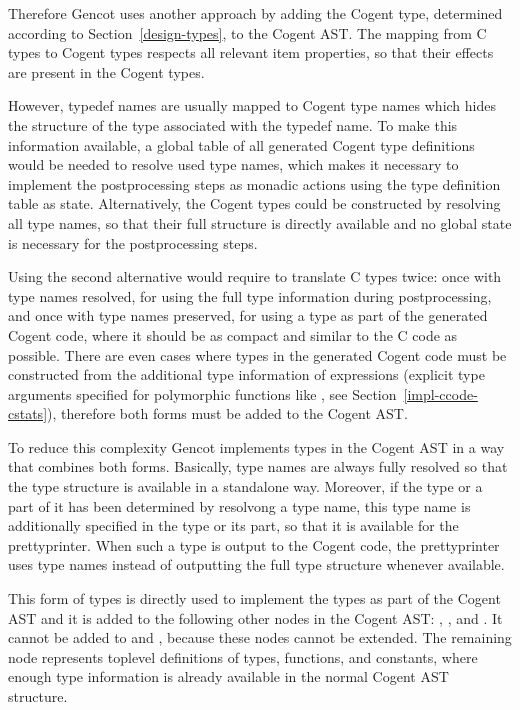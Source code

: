 Therefore Gencot uses another approach by adding the Cogent type, determined according to Section~\ref{design-types}, to
the Cogent AST. The mapping from C types to Cogent types respects all relevant item properties, so that their effects are
present in the Cogent types.

However, typedef names are usually mapped to Cogent type names which hides the structure of the type associated with the
typedef name. To make this information available, a global table of all generated Cogent type definitions would be needed
to resolve used type names, which makes it necessary to implement the postprocessing steps as monadic actions using the
type definition table as state. Alternatively, the Cogent types could be constructed by resolving all type names, so that
their full structure is directly available and no global state is necessary for the postprocessing steps.

Using the second alternative would require to translate C types twice: once with type names resolved, for using the full type
information during postprocessing, and once with type names preserved, for using a type as part of the generated Cogent
code, where it should be as compact and similar to the C code as possible. There are even cases where types in the generated
Cogent code must be constructed from the additional type information of expressions (explicit type arguments specified for
polymorphic functions like , see Section~\ref{impl-ccode-cstats}), therefore both forms must be added to the
Cogent AST.

To reduce this complexity Gencot implements types in the Cogent AST in a way that combines both forms. Basically, type names
are always fully resolved so that the type structure is available in a standalone way. Moreover, if the type or a part of
it has been determined by resolvong a type name, this type name is additionally specified in the type or its part, so that
it is available for the prettyprinter. When such a type is output to the Cogent code, the prettyprinter uses type names
instead of outputting the full type structure whenever available.

This form of types is directly used to implement the types as part of the Cogent AST and it is added to the following
other nodes in the Cogent AST: , , and . It cannot be added to
 and , because these nodes cannot be extended. The remaining node  represents
toplevel definitions of types, functions, and constants, where enough type information is already available in the
normal Cogent AST structure.

